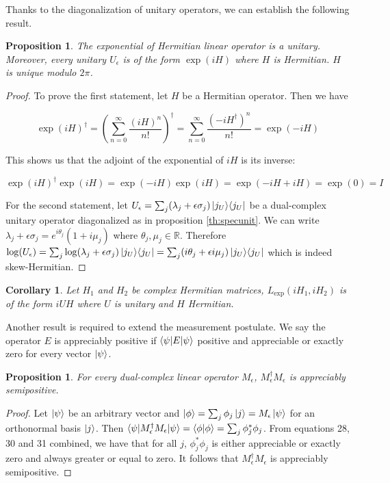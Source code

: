 \documentclass{article}
\newtheorem{proposition}[theorem]{Proposition}
\newtheorem{corollary}[theorem]{Corollary}
\newcommand{\R}{\mathbb{R}}
\newcommand{\e}{\epsilon}
\newcommand\ketbra[2]{\ket{#1}\!\bra{#2}}
\begin{document}
Thanks to the diagonalization of unitary operators, we can establish the following result.

\begin{proposition}\label{pr:hermunit}
The exponential of Hermitian linear operator is a unitary. Moreover, every unitary $U_\e$ is of the form $\exp(iH)$ where $H$ is Hermitian. $H$ is unique modulo $2\pi$.
\end{proposition}
\begin{proof}
To prove the first statement, let $H$ be a Hermitian operator. Then we have

\begin{equation}
 \exp(iH)^\dagger = (\sum_{n=0}^\infty \frac{(iH)^n}{n!})^\dagger = \sum_{n=0}^\infty \frac{(-iH^\dagger)^n}{n!} = \exp(-iH)
\end{equation}

This shows us that the adjoint of the exponential of $iH$ is its inverse:

\begin{equation}
 \exp(iH)^\dagger \exp(iH) = \exp(-iH) \exp(iH) = \exp(-iH+iH) = \exp(0) = I
\end{equation}

For the second statement, let $U_\e = \sum_j (\lambda_j + \e \sigma_j) \ketbra{j_U}{j_U}$ be a dual-complex unitary operator diagonalized as in proposition \ref{th:specunit}. We can write $\lambda_j + \e \sigma_j = e^{i\theta_j}(1 + i\mu_j)$ where $\theta_j, \mu_j \in \R$. Therefore $\log(U_\e) = \sum_j \log(\lambda_j + \e \sigma_j)\ketbra{j_U}{j_U} = \sum_j (i\theta_j + \e i\mu_j)\ketbra{j_U}{j_U}$ which is indeed skew-Hermitian.

\end{proof}

\begin{corollary}
Let $H_1$ and $H_2$ be complex Hermitian matrices, $L_{\exp}(iH_1, iH_2)$ is of the form $iUH$ where $U$ is unitary and $H$ Hermitian.
\end{corollary}

Another result is required to extend the measurement postulate. We say the operator $E$ is appreciably positive if $\braket{\psi|E|\psi}$ positive and appreciable or exactly zero for every vector $\ket\psi$.

\begin{proposition}\label{pr:semipos}
 For every dual-complex linear operator $M_\e$, $M_\e^\dagger M_\e$ is appreciably semipositive.
\end{proposition}
\begin{proof}
Let $\ket\psi$ be an arbitrary vector and $\ket\phi = \sum_j \phi_j \ket{j} = M_\e \ket\psi$ for an orthonormal basis $\ket{j}$. Then $\braket{\psi|M_\e^\dagger M_\e|\psi} = \braket{\phi|\phi} = \sum_j \phi_j^*\phi_j$. From equations 28, 30 and 31 combined, we have that for all $j$, $\phi_j^* \phi_j$ is either appreciable or exactly zero and always greater or equal to zero. It follows that $M_\e^\dagger M_\e$ is appreciably semipositive.
\end{proof}
\end{document}
